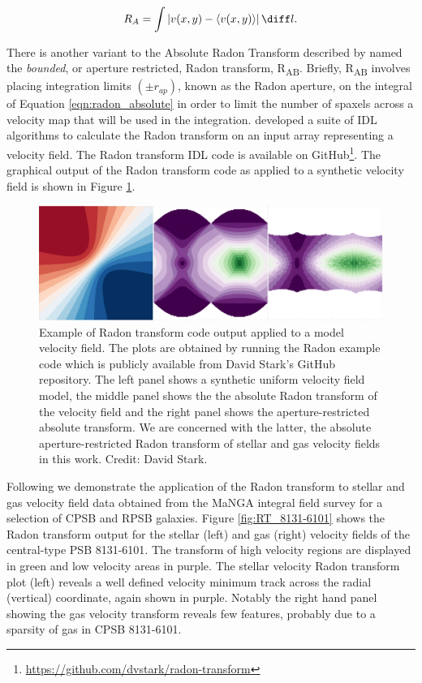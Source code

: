 \begin{equation}
    \label{eqn:radon_absolute}
    R_A=\int{| v(x,y) - \langle v(x,y) \rangle | \, \diff l}.
\end{equation}

There is another variant to the Absolute Radon Transform described by \citet{2018MNRAS.480.2217S} named the \textit{bounded}, or aperture restricted, Radon transform, R\textsubscript{AB}. Briefly, R\textsubscript{AB} involves placing integration limits $(\pm{r_{ap}})$, known as the Radon aperture, on the integral of Equation \ref{eqn:radon_absolute} in order to limit the number of spaxels across a velocity map that will be used in the integration. \citet{2018MNRAS.480.2217S} developed a suite of IDL algorithms to calculate the Radon transform on an input array representing a velocity field. The Radon transform IDL code is available on GitHub\footnote{\href{https://github.com/dvstark/radon-transform}{https://github.com/dvstark/radon-transform}}. 
The graphical output of the Radon transform code as applied to a synthetic velocity field is shown in Figure \ref{fig:Radon}.

\begin{figure}
    \centering
   	\includegraphics[width=\columnwidth]{images/RadonPlots/example.png}
    \caption[Model velocity field Radon transform plots]{Example of Radon transform code output applied to a model velocity field. The plots are obtained by running the Radon example code which is publicly available from David Stark's GitHub repository. The left panel shows a synthetic uniform velocity field model, the middle panel shows the the absolute Radon transform of the velocity field and the right panel shows the aperture-restricted absolute transform. We are concerned with the latter, the absolute aperture-restricted Radon transform of stellar and gas velocity fields in this work. Credit: David Stark.}
    \label{fig:Radon}
\end{figure}

Following \citet{2018MNRAS.480.2217S} we demonstrate the application of the Radon transform to stellar and gas velocity field data obtained from the MaNGA integral field survey for a selection of CPSB and RPSB galaxies. Figure \ref{fig:RT_8131-6101} shows the Radon transform output for the stellar (left) and gas (right) velocity fields of the central-type PSB 8131-6101. The transform of high velocity regions are displayed in green and low velocity areas in purple. The stellar velocity Radon transform plot (left) reveals a well defined velocity minimum track across the radial (vertical) coordinate, again shown in purple. Notably the right hand panel showing the gas velocity transform reveals few features, probably due to a sparsity of gas in CPSB 8131-6101.

